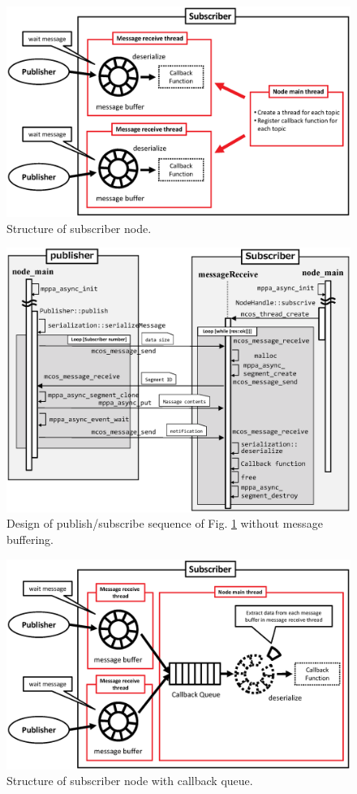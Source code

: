 \clearpage

\begin{figure}[!htbp]
  \centering
  \includegraphics[width=0.7\linewidth]{../figure/roslite/design/subscriber_design1.eps}
  \caption{\label{fig:subscriber_design1}
    Structure of subscriber node.}
\end{figure}

\begin{figure}[!htbp]
  \centering
  \includegraphics[width=0.7\linewidth]{../figure/roslite/design/pubsub_thread_design1.eps}
  \caption{\label{fig:pubsub_thread_design1}
    Design of publish/subscribe sequence of Fig. \ref{fig:subscriber_design1} without message buffering.}
\end{figure}

\begin{figure}[!htbp]
  \centering
  \includegraphics[width=0.7\linewidth]{../figure/roslite/design/subscriber_design2.eps}
  \caption{\label{fig:subscriber_design2}
    Structure of subscriber node with callback queue.}
\end{figure}

